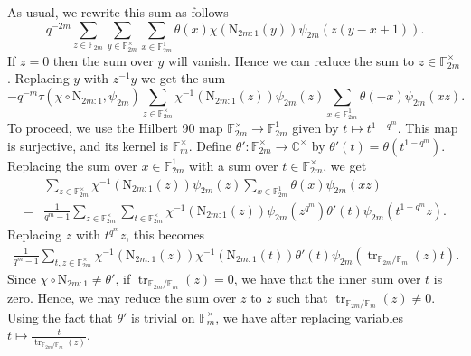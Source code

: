 \documentclass[12pt, reqno]{amsart}
\theoremstyle{definition}
\theoremstyle{definition}
\theoremstyle{definition}
\newcommand{\cComplex}{\mathbb{C}}
\newcommand{\multiplicativegroup}[1]{#1^{\times}}
\newcommand{\fieldCharacter}{\psi}
\newcommand{\trace}{\operatorname{tr}}
\newcommand{\FieldNorm}[2]{\mathrm{N}_{#1:#2}}
\newcommand{\finiteField}{\mathbb{F}}
\newcommand{\finiteFieldExtension}[1]{\finiteField_{#1}}
\begin{document}
As usual, we rewrite this sum as follows
$$q^{-2m} \sum_{z \in \finiteFieldExtension{2m}} \sum_{y \in \multiplicativegroup{\finiteFieldExtension{2m}}} \sum_{x \in \finiteFieldExtension{2m}^1} \theta \left(x\right) \chi\left(\FieldNorm{2m}{1}\left(y\right)\right) \fieldCharacter_{2m}\left(z\left(y-x+1\right)\right).$$
If $z=0$ then the sum over $y$ will vanish. Hence we can reduce the sum to $z \in \multiplicativegroup{\finiteFieldExtension{2m}}$. Replacing $y$ with $z^{-1} y$ we get the sum
$$-q^{-m} \tau\left(\chi \circ \FieldNorm{2m}{1}, \fieldCharacter_{2m}\right) \sum_{z \in \multiplicativegroup{\finiteFieldExtension{2m}}} \chi^{-1}\left(\FieldNorm{2m}{1}\left(z\right)\right) \fieldCharacter_{2m}\left(z\right)  \sum_{x \in \finiteFieldExtension{2m}^1} \theta \left(-x\right) \fieldCharacter_{2m}\left(xz\right).$$
To proceed, we use the Hilbert 90 map $\multiplicativegroup{\finiteFieldExtension{2m}} \to \finiteFieldExtension{2m}^1$ given by $t \mapsto t^{1 - q^m}$. This map is surjective, and its kernel is $\multiplicativegroup{\finiteFieldExtension{m}}$. Define $\theta' \colon \multiplicativegroup{\finiteFieldExtension{2m}} \to \multiplicativegroup{\cComplex}$ by $\theta'\left(t\right) = \theta\left(t^{1-q^m}\right)$. Replacing the sum over $x \in \finiteFieldExtension{2m}^1$ with a sum over $t \in \multiplicativegroup{\finiteFieldExtension{2m}}$, we get \begin{align*}
	& \sum_{z \in \multiplicativegroup{\finiteFieldExtension{2m}}} \chi^{-1}\left(\FieldNorm{2m}{1}\left(z\right)\right) \fieldCharacter_{2m}\left(z\right) \sum_{x \in \finiteFieldExtension{2m}^1} \theta \left(x\right) \fieldCharacter_{2m}\left(xz\right) \\
	= & \frac{1}{q^m-1}\sum_{z \in \multiplicativegroup{\finiteFieldExtension{2m}}} \sum_{t \in \multiplicativegroup{\finiteFieldExtension{2m}}} \chi^{-1}\left(\FieldNorm{2m}{1}\left(z\right)\right) \fieldCharacter_{2m}\left(z^{q^m}\right) \theta' \left(t\right) \fieldCharacter_{2m}\left(t^{1-q^m} z\right).
\end{align*}
Replacing $z$ with $t^{q^m} z$, this becomes
\begin{align*}
	\frac{1}{q^m-1}\sum_{t,z \in \multiplicativegroup{\finiteFieldExtension{2m}}} \chi^{-1}\left(\FieldNorm{2m}{1}\left(z\right)\right) \chi^{-1}\left(\FieldNorm{2m}{1}\left(t\right)\right) \theta' \left(t\right) \fieldCharacter_{2m}\left(\trace_{\finiteFieldExtension{2m} \slash \finiteFieldExtension{m}}\left(z\right) t\right).
\end{align*}
Since $\chi \circ \FieldNorm{2m}{1} \ne \theta'$, if $\trace_{\finiteFieldExtension{2m} \slash \finiteFieldExtension{m}}\left(z\right) = 0$, we have that the inner sum over $t$ is zero. Hence, we may reduce the sum over $z$ to $z$ such that $\trace_{\finiteFieldExtension{2m} \slash \finiteFieldExtension{m}}\left(z\right) \ne 0$. Using the fact that $\theta'$ is trivial on $\multiplicativegroup{\finiteFieldExtension{m}}$, we have after replacing variables $t \mapsto \frac{t}{\trace_{\finiteFieldExtension{2m} \slash \finiteFieldExtension{m}}\left(z\right)}$,
\end{document}
